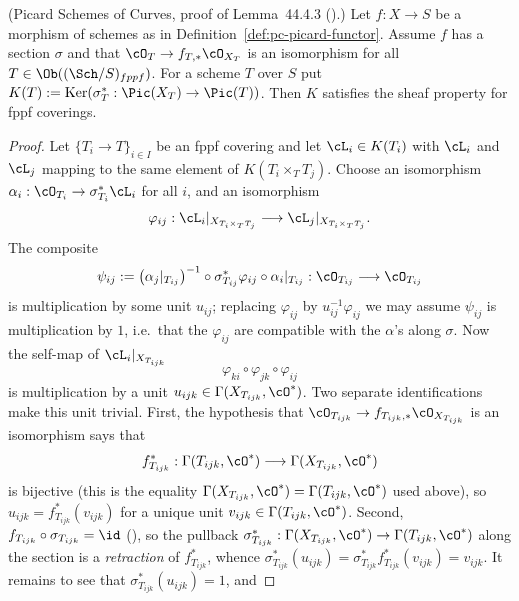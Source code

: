 \begin{lemma}
\label{lem:pc-k-sheaf}
(Picard Schemes of Curves, proof of Lemma~44.4.3 ().)
Let $f:X\to S$ be a morphism of schemes as in
Definition~\ref{def:pc-picard-functor}.
Assume $f$ has a section $\sigma$ and that
$\cO_T\to f_{T,*}\cO_{X_T}$ is an isomorphism for all
$T\in\Ob((\Sch/S)_{fppf})$.  For a scheme $T$ over $S$ put
$K(T):=\operatorname{Ker}(\sigma_T^*:\Pic(X_T)\to\Pic(T))$.  Then $K$
satisfies the sheaf property for fppf coverings.
\end{lemma}
\begin{proof}
Let $\{T_i\to T\}_{i\in I}$ be an fppf covering and let
$\cL_i\in K(T_i)$ with $\cL_i$ and $\cL_j$ mapping to the same element of
$K(T_i\times_TT_j)$.
Choose an isomorphism $\alpha_i:\cO_{T_i}\to\sigma_{T_i}^*\cL_i$ for all
$i$, and an isomorphism
\[
\varphi_{ij}:\cL_i|_{X_{T_i\times_TT_j}}\longrightarrow
\cL_j|_{X_{T_i\times_TT_j}} .
\]
The composite
\[
\psi_{ij}:=\bigl(\alpha_j|_{T_{ij}}\bigr)^{-1}\circ
\sigma_{T_{ij}}^*\varphi_{ij}\circ\alpha_i|_{T_{ij}}:
\cO_{T_{ij}}\longrightarrow\cO_{T_{ij}}
\]
is multiplication by some unit $u_{ij}$; replacing $\varphi_{ij}$ by
$u_{ij}^{-1}\varphi_{ij}$ we may assume $\psi_{ij}$ is
multiplication by $1$, i.e.\ that the $\varphi_{ij}$ are compatible with
the $\alpha$'s along $\sigma$.
Now the self-map of $\cL_i|_{X_{T_{ijk}}}$
\[
\varphi_{ki}\circ\varphi_{jk}\circ\varphi_{ij}
\]
is multiplication by a unit
$u_{ijk}\in\Gamma(X_{T_{ijk}},\cO^*)$.  Two separate identifications make
this unit trivial.  First, the hypothesis that
$\cO_{T_{ijk}}\to f_{T_{ijk},*}\cO_{X_{T_{ijk}}}$ is an isomorphism says
that
\[
f_{T_{ijk}}^*:\Gamma(T_{ijk},\cO^*)\longrightarrow
\Gamma(X_{T_{ijk}},\cO^*)
\]
is bijective (this is the equality
$\Gamma(X_{T_{ijk}},\cO^*)=\Gamma(T_{ijk},\cO^*)$ used above), so
$u_{ijk}=f_{T_{ijk}}^*(v_{ijk})$ for a unique unit
$v_{ijk}\in\Gamma(T_{ijk},\cO^*)$.  Second,
$f_{T_{ijk}}\circ\sigma_{T_{ijk}}=\id$ (), so the
pullback $\sigma_{T_{ijk}}^*:\Gamma(X_{T_{ijk}},\cO^*)\to
\Gamma(T_{ijk},\cO^*)$ along the section is a \emph{retraction} of
$f_{T_{ijk}}^*$, whence
$\sigma_{T_{ijk}}^*(u_{ijk})=\sigma_{T_{ijk}}^*f_{T_{ijk}}^*(v_{ijk})
=v_{ijk}$.  It remains to see that $\sigma_{T_{ijk}}^*(u_{ijk})=1$, and

\end{proof}
